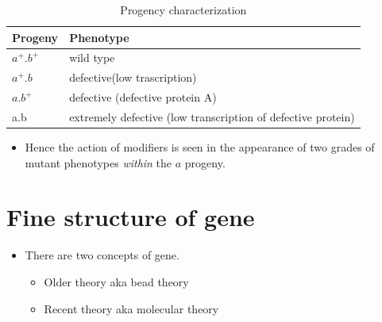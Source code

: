 \documentclass[11pt,dvipsnames,ignorenonframetext,aspectratio=169]{beamer}
\providecommand{\tightlist}{%
  \setlength{\itemsep}{0pt}\setlength{\parskip}{0pt}}
\begin{document}
\begin{frame}{}
\protect\hypertarget{section-22}{}
\begin{table}

\caption{\label{tab:gene-modifieres}Progency characterization}
\centering
\fontsize{8}{10}\selectfont
\begin{tabular}[t]{ll}
\toprule
Progeny & Phenotype\\
\midrule
$a^+. b^+$ & wild type\\
$a^+.b$ & defective(low trascription)\\
$a.b^+$ & defective (defective protein A)\\
a.b & extremely defective (low transcription of defective protein)\\
\bottomrule
\end{tabular}
\end{table}

\begin{itemize}
\tightlist
\item
  Hence the action of modifiers is seen in the appearance of two grades
  of mutant phenotypes \emph{within} the \(a\) progeny.
\end{itemize}
\end{frame}

\hypertarget{fine-structure-of-gene}{%
\section{Fine structure of gene}\label{fine-structure-of-gene}}

\begin{frame}{}
\protect\hypertarget{section-23}{}
\begin{itemize}
\tightlist
\item
  There are two concepts of gene.

  \begin{itemize}
  \tightlist
  \item
    Older theory aka bead theory
  \item
    Recent theory aka molecular theory
  \end{itemize}
\end{itemize}
\end{frame}
\end{document}
